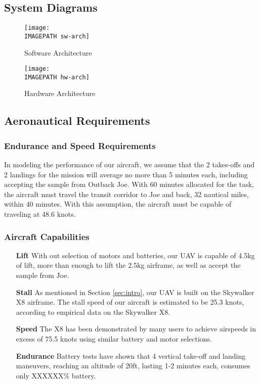 \subsection{System Diagrams}

\begin{figure}[H]
	\centering
	\texttt{[image: \\IMAGEPATH sw-arch]}
	\caption{Software Architecture}
	\label{fig:sw-arch}
\end{figure}

\begin{figure}[H]
	\centering
	\texttt{[image: \\IMAGEPATH hw-arch]}
	\caption{Hardware Architecture}
	\label{fig:hw-arch}
\end{figure}

\subsection{Aeronautical Requirements}
\subsubsection{Endurance and Speed Requirements}
In modeling the performance of our aircraft, we assume that the 2 takes-offs and 2 landings for the mission will average no more than 5 minutes each, including accepting the sample from Outback Joe. With 60 minutes allocated for the task, the aircraft must travel the transit corridor to Joe and back, 32 nautical miles, within 40 minutes. With this assumption, the aircraft must be capable of traveling at 48.6 knots. 

\subsubsection{Aircraft Capabilities}
\begin{itemize}
	\item[\textbf{Lift}] With out selection of motors and batteries, our UAV is capable of 4.5kg of lift, more than enough to lift the 2.5kg airframe, as well as accept the sample from Joe.
	\item[\textbf{Stall}] As mentioned in Section \ref{sec:intro}, our UAV is built on the Skywalker X8 airframe. The stall speed of our aircraft is estimated to be 25.3 knots, according to empirical data on the Skywalker X8.
	\item[\textbf{Speed}] The X8 has been demonstrated by many users to achieve airspeeds in excess of 75.5 knots using similar battery and motor selections.
	\item[\textbf{Endurance}] Battery tests have shown that 4 vertical take-off and landing maneuvers, reaching an altitude of 20ft, lasting 1-2 minutes each, consumes only XXXXXX\% battery. 
\end{itemize}

